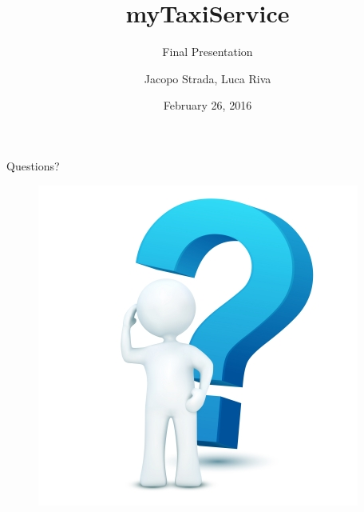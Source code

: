 \documentclass[9pt]{beamer}
\title{myTaxiService}
\subtitle{Final Presentation}
\author{Jacopo Strada, Luca Riva}
\date{February 26, 2016}
\institute[]{Politecnico di Milano\\Software Engineering 2 Project}
\begin{document}
\maketitle










\begin{frame}{Questions?}
\begin{figure}[H]
\includegraphics[height=.6\textheight]{questions}
\centering
\end{figure}
\end{frame}
\end{document}
